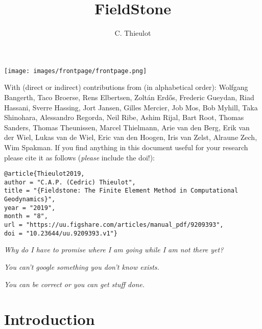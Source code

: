 \documentclass[a4paper]{article}
\title{FieldStone}
\author{C. Thieulot}
\numberwithin{equation}{section}
\begin{document}
\thispagestyle{empty}
\texttt{[image: images/frontpage/frontpage.png]}

{\scriptsize With (direct or indirect) contributions from (in alphabetical order): 
Wolfgang Bangerth, 
Taco Broerse,
Rens Elbertsen,
Zolt{\'a}n Erd{\H{o}}s, 
Frederic Gueydan,
Riad Hassani,
Sverre Hassing,
Jort Jansen,
Gilles Mercier,
Job Mos, 
Bob Myhill,
Taka Shinohara, 
Alessandro Regorda,
Neil Ribe,
Ashim Rijal,
Bart Root,
Thomas Sanders,
Thomas Theunissen,
Marcel Thielmann,
Arie van den Berg,
Erik van der Wiel, 
Lukas van de Wiel, 
Eric van den Hoogen, 
Iris van Zelst,
Alraune Zech, 
Wim Spakman.}
\newpage
If you find anything in this document useful for your research please cite it 
as follows ({\it please} include the doi!):

\begin{verbatim}
@article{Thieulot2019,
author = "C.A.P. (Cedric) Thieulot",
title = "{Fieldstone: The Finite Element Method in Computational Geodynamics}",
year = "2019",
month = "8",
url = "https://uu.figshare.com/articles/manual_pdf/9209393",
doi = "10.23644/uu.9209393.v1"}
\end{verbatim}

\vspace{7cm}

\begin{center}
{\sl Why do I have to promise where I am going while I am not there yet?}

\vspace{1cm}

{\sl You can't google something you don't know exists.}

\vspace{1cm}

{\sl You can be correct or you can get stuff done.}
\end{center}





\newpage
\maketitle
\tableofcontents


\newpage
\section{Introduction} %
 
\end{document}

